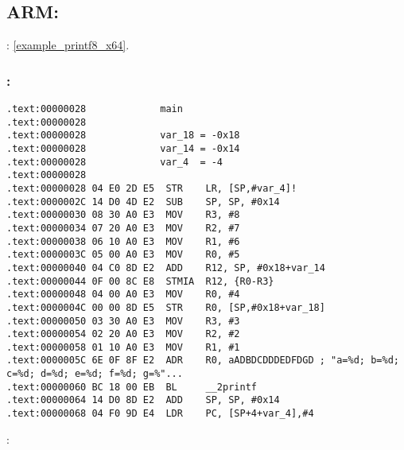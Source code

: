 \subsection{ARM: }

: \ref{example_printf8_x64}.



\subsubsection{\OptimizingKeilVI: \ARMMode}

\begin{lstlisting}
.text:00000028             main
.text:00000028
.text:00000028             var_18 = -0x18
.text:00000028             var_14 = -0x14
.text:00000028             var_4  = -4
.text:00000028
.text:00000028 04 E0 2D E5  STR    LR, [SP,#var_4]!
.text:0000002C 14 D0 4D E2  SUB    SP, SP, #0x14
.text:00000030 08 30 A0 E3  MOV    R3, #8
.text:00000034 07 20 A0 E3  MOV    R2, #7
.text:00000038 06 10 A0 E3  MOV    R1, #6
.text:0000003C 05 00 A0 E3  MOV    R0, #5
.text:00000040 04 C0 8D E2  ADD    R12, SP, #0x18+var_14
.text:00000044 0F 00 8C E8  STMIA  R12, {R0-R3}
.text:00000048 04 00 A0 E3  MOV    R0, #4
.text:0000004C 00 00 8D E5  STR    R0, [SP,#0x18+var_18]
.text:00000050 03 30 A0 E3  MOV    R3, #3
.text:00000054 02 20 A0 E3  MOV    R2, #2
.text:00000058 01 10 A0 E3  MOV    R1, #1
.text:0000005C 6E 0F 8F E2  ADR    R0, aADBDCDDDEDFDGD ; "a=%d; b=%d; c=%d; d=%d; e=%d; f=%d; g=%"...
.text:00000060 BC 18 00 EB  BL     __2printf
.text:00000064 14 D0 8D E2  ADD    SP, SP, #0x14
.text:00000068 04 F0 9D E4  LDR    PC, [SP+4+var_4],#4
\end{lstlisting}

:

